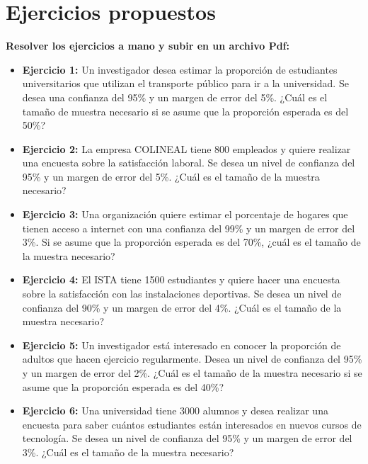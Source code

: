 \documentclass[12pt]{article}
\begin{document}
    
  
    \section*{\centering Ejercicios propuestos}

        \vspace{0.6cm}
        \noindent \textbf{Resolver los ejercicios a mano y subir en un archivo  Pdf:}

        \vspace{0.6cm}
        \begin{itemize}
            \item \textbf{Ejercicio 1:} Un investigador desea estimar la proporción de estudiantes universitarios que utilizan el transporte público para ir a la universidad. Se desea una confianza del 95\% y un margen de error del 5\%. ¿Cuál es el tamaño de muestra necesario si se asume que la proporción esperada es del 50\%?
            
            
            \item \textbf{Ejercicio 2:} La empresa COLINEAL tiene 800 empleados y quiere realizar una encuesta sobre la satisfacción laboral. Se desea un nivel de confianza del 95\% y un margen de error del 5\%. ¿Cuál es el tamaño de la muestra necesario?
            
            
            \item \textbf{Ejercicio 3:} Una organización quiere estimar el porcentaje de hogares que tienen acceso a internet con una confianza del 99\% y un margen de error del 3\%. Si se asume que la proporción esperada es del 70\%, ¿cuál es el tamaño de la muestra necesario?
            
            
            \item \textbf{Ejercicio 4:} El ISTA tiene 1500 estudiantes y quiere hacer una encuesta sobre la satisfacción con las instalaciones deportivas. Se desea un nivel de confianza del 90\% y un margen de error del 4\%. ¿Cuál es el tamaño de la muestra necesario?
            
            
            \item \textbf{Ejercicio 5:} Un investigador está interesado en conocer la proporción de adultos que hacen ejercicio regularmente. Desea un nivel de confianza del 95\% y un margen de error del 2\%. ¿Cuál es el tamaño de la muestra necesario si se asume que la proporción esperada es del 40\%?
            
            
            \item \textbf{Ejercicio 6:} Una universidad tiene 3000 alumnos y desea realizar una encuesta para saber cuántos estudiantes están interesados en nuevos cursos de tecnología. Se desea un nivel de confianza del 95\% y un margen de error del 3\%. ¿Cuál es el tamaño de la muestra necesario?
            

        \end{itemize}
\end{document}
